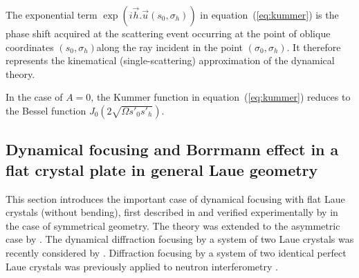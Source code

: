 \documentclass[preprint]{iucr}              %
\begin{document}
The exponential term $\exp(i \vec h . \vec u(s_0,\sigma_h))$ in equation~(\ref{eq:kummer}) is the phase shift acquired at the scattering event occurring at the point of oblique coordinates $(s_0,\sigma_h)$along the ray incident in the point $(\sigma_0,\sigma_h)$. It therefore represents the kinematical (single-scattering) approximation of the dynamical theory.

In the case of $A=0$, the Kummer function in equation~(\ref{eq:kummer}) reduces to the Bessel function $J_0(2\sqrt{\Omega s'_0 s'_h})$. 
          
\subsection{Dynamical focusing and Borrmann effect in a flat crystal plate in general Laue geometry}
\label{sec:LaueFlat}



This section introduces the important case of dynamical focusing with flat Laue crystals (without bending), first described in \cite{AfanasevKohn1977} and verified experimentally by \cite{Aristov1978, Aristov1980}
in the case of symmetrical geometry. The theory was extended to the asymmetric case by \cite{Kohn2000}. The dynamical diffraction focusing by a system of two Laue crystals was recently considered by \cite{KohnSmirnova}. Diffraction focusing by a system of two identical perfect Laue crystals was previously applied to neutron interferometry \cite{Zeilinger}.
\end{document}
